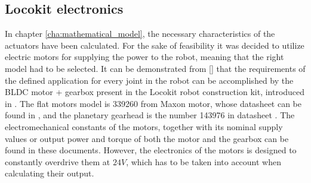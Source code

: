 
\subsection{Locokit electronics} %
\label{sub:locokit_electronics}
In chapter \ref{cha:mathematical_model}, the necessary characteristics of the actuators have been calculated.
For the sake of feasibility it was decided to utilize electric motors for supplying the power to the robot, meaning that the right model had to be selected.
It can be demonstrated from \ref{} %
that the requirements of the defined application for every joint in the robot can be accomplished by the BLDC motor + gearbox present in the Locokit robot construction kit, introduced in \cite{locokit}.
The flat motors model is 339260 from Maxon motor, whose datasheet can be found in \cite{maxon_motor}, and the planetary gearhead is the number 143976 in datasheet \cite{maxon_gear}.
The electromechanical constants of the motors, together with its nominal supply values or output power and torque of both the motor and the gearbox can be found in these documents. 
However, the electronics of the motors is designed to constantly overdrive them at $24V$, which has to be taken into account when calculating their output.


